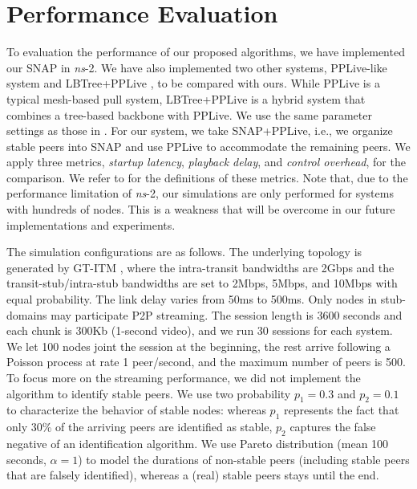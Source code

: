 \documentclass[conference]{IEEEtran}
\begin{document}
\section{Performance Evaluation} \label{sec:perfevl}
  To evaluation the performance of our proposed algorithms, we have implemented our SNAP in \textit{ns}-2. We have also implemented two other systems, PPLive-like system \cite{HeiLLLR-IPTV06} and LBTree+PPLive \cite{WangLX-INFOCOM08}, to be compared with ours. While PPLive is a typical mesh-based pull system, LBTree+PPLive is a hybrid system that combines a tree-based backbone with PPLive. We use the same parameter settings as those in \cite{WangLX-INFOCOM08}. For our system, we take SNAP+PPLive, i.e., we organize stable peers into SNAP and use PPLive to accommodate the remaining peers. We apply three metrics, \textit{startup latency}, \textit{playback delay}, and \textit{control overhead}, for the comparison. We refer to \cite{WangLX-INFOCOM08} for the definitions of these metrics. Note that, due to the performance limitation of \textit{ns}-2, our simulations are only performed for systems with hundreds of nodes. This is a weakness that will be overcome in our future implementations and experiments.
  
  The simulation configurations are as follows. The underlying topology is generated by GT-ITM \cite{itm}, where the intra-transit bandwidths are 2Gbps and the transit-stub/intra-stub bandwidths are set to 2Mbps, 5Mbps, and 10Mbps with equal probability. The link delay varies from 50ms to 500ms. Only nodes in stub-domains may participate P2P streaming. The session length is 3600 seconds and each chunk is 300Kb (1-second video), and we run 30 sessions for each system. We let 100 nodes joint the session at the beginning, the rest arrive following a Poisson process at rate 1 peer/second, and the maximum number of peers is 500. To focus more on the streaming performance, we did not implement the algorithm to identify stable peers. We use two probability $p_1=0.3$ and $p_2=0.1$ to characterize the behavior of stable nodes: whereas $p_1$ represents the fact that only 30\% of the arriving peers are identified as stable, $p_2$ captures the false negative of an identification algorithm. We use Pareto distribution (mean 100 seconds, $\alpha=1$) to model the durations of non-stable peers (including stable peers that are falsely identified), whereas a (real) stable peers stays until the end.
\end{document}
